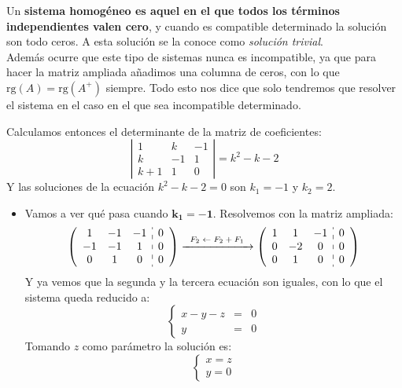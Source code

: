 \documentclass[a4paper,11pt,answers]{exam}
\newcommand\rango[1]{\mathrm{rg}(#1)}
\begin{document}
\begin{questions}
\begin{solution}
	Un \textbf{sistema homogéneo es aquel en el que todos los términos independientes valen cero}, y cuando es compatible determinado la solución son todo ceros. A esta solución se la conoce como \emph{solución trivial}.\\
	Además ocurre que este tipo de sistemas nunca es incompatible, ya que para hacer la matriz ampliada añadimos una columna de ceros, con lo que $\rango{A} = \rango{A^+}$ siempre.
	Todo esto nos dice que solo tendremos que resolver el sistema en el caso en el que sea incompatible determinado.
	
	Calculamos entonces el determinante de la matriz de coeficientes:
	\[\left|\begin{array}{rrr}
		1&k&-1\\
		k&-1&1\\
		k+1&1&0
	\end{array}\right| = k^2 -k -2\]
	Y las soluciones de la ecuación $k^2 - k -2 =0$ son $k_1 = -1$ y $k_2=2$.
	\begin{itemize}
	\item Vamos a ver qué pasa cuando $\boldsymbol{k_1=-1}$. Resolvemos con la matriz ampliada:
	\[\left(\begin{array}{ccc:c}
		1&-1&-1&0\\
		-1&-1&1&0\\
		0&1&0&0
	\end{array}\right) \xrightarrow{\begin{scriptsize}
	\begin{array}{c}
	F_2 \leftarrow F_2 + F_1
	\end{array}
	\end{scriptsize}} \left(\begin{array}{ccc:c}
		1&1&-1&0\\
		0&-2&0&0\\
		0&1&0&0
	\end{array}\right)\]
	Y ya vemos que la segunda y la tercera ecuación son iguales, con lo que el sistema queda reducido a:
	\[\left\lbrace\begin{array}{lll}
	x -y -z &=& 0\\
	 y &=& 0
	\end{array}
	\right.\]
	Tomando $z$ como parámetro la solución es:
	\[\left\lbrace\begin{array}{l}
	x = z\\
	 y = 0
	\end{array}
	\right.\]
	

\end{itemize}
\end{solution}
\end{questions}
\end{document}
